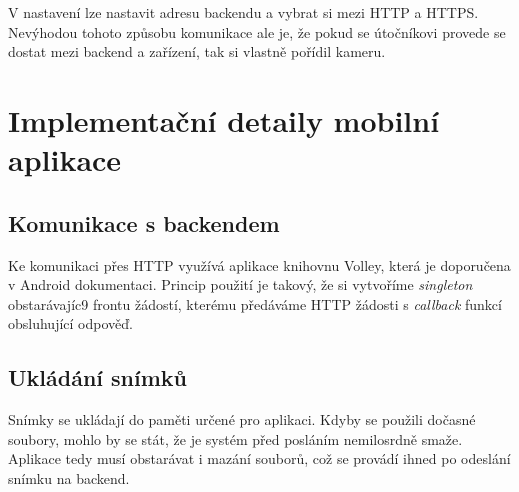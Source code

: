 V nastavení lze nastavit adresu backendu a vybrat si mezi HTTP a HTTPS.
Nevýhodou tohoto způsobu komunikace ale je, že pokud se útočníkovi provede
se dostat mezi backend a zařízení, tak si vlastně pořídil kameru.

\section{Implementační detaily mobilní aplikace}

\subsection{Komunikace s backendem}

Ke komunikaci přes HTTP využívá aplikace knihovnu Volley, která je doporučena
v Android dokumentaci. Princip použití je takový, že si vytvoříme
\textit{singleton} obstarávajíc9 frontu žádostí, kterému předáváme HTTP žádosti s
\textit{callback} funkcí obsluhující odpověď. \citep[viz][]{Volley1}

\subsection{Ukládání snímků}

Snímky se ukládají do paměti určené pro aplikaci. Kdyby se použili dočasné soubory,
mohlo by se stát, že je systém před posláním nemilosrdně smaže.
\citep[viz][]{AndroidMem}
Aplikace tedy musí obstarávat i mazání souborů, což se provádí
ihned po odeslání snímku na backend.

